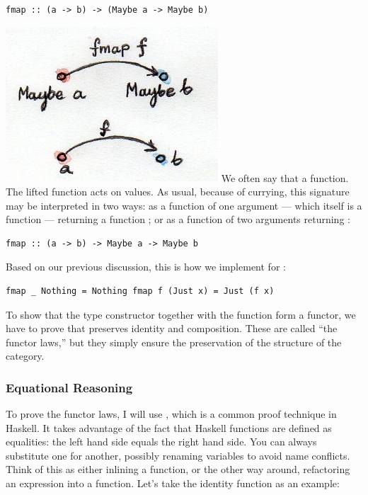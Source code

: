 \begin{verbatim}
fmap :: (a -> b) -> (Maybe a -> Maybe b)
\end{verbatim}

\includegraphics[width=3.12500in]{images/functormaybe.jpg} We often say
that   a function. The lifted function acts on
 values. As usual, because of currying, this signature may
be interpreted in two ways: as a function of one argument --- which
itself is a function  --- returning a
function ; or as a
function of two arguments returning :

\begin{verbatim}
fmap :: (a -> b) -> Maybe a -> Maybe b
\end{verbatim}

Based on our previous discussion, this is how we implement 
for :

\begin{verbatim}
fmap _ Nothing = Nothing fmap f (Just x) = Just (f x)
\end{verbatim}

To show that the type constructor  together with the
function  form a functor, we have to prove that
 preserves identity and composition. These are called ``the
functor laws,'' but they simply ensure the preservation of the structure
of the category.

\subsubsection{Equational Reasoning}\label{equational-reasoning}

To prove the functor laws, I will use , which
is a common proof technique in Haskell. It takes advantage of the fact
that Haskell functions are defined as equalities: the left hand side
equals the right hand side. You can always substitute one for another,
possibly renaming variables to avoid name conflicts. Think of this as
either inlining a function, or the other way around, refactoring an
expression into a function. Let's take the identity function as an
example:

